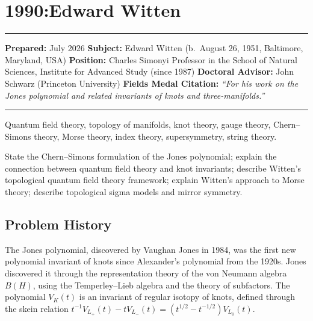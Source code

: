 \chapter{1990:Edward Witten}\label{ch1990edwardwitten:edward-witten-fields-medal-1990-a-comprehensive-report}

\begin{center}\rule{0.5\linewidth}{0.5pt}\end{center}

\textbf{Prepared:} July 2026 \textbf{Subject:} Edward Witten (b.~August 26, 1951, Baltimore, Maryland, USA) \textbf{Position:} Charles Simonyi Professor in the School of Natural Sciences, Institute for Advanced Study (since 1987) \textbf{Doctoral Advisor:} John Schwarz (Princeton University) \textbf{Fields Medal Citation:} \emph{``For his work on the Jones polynomial and related invariants of knots and three-manifolds.''}

\begin{center}\rule{0.5\linewidth}{0.5pt}\end{center}

\begin{prereqs} Quantum field theory, topology of manifolds, knot theory, gauge theory, Chern--Simons theory, Morse theory, index theory, supersymmetry, string theory. \end{prereqs}

\begin{objectives} State the Chern--Simons formulation of the Jones polynomial; explain the connection between quantum field theory and knot invariants; describe Witten's topological quantum field theory framework; explain Witten's approach to Morse theory; describe topological sigma models and mirror symmetry. \end{objectives}

\section{Problem History}

The Jones polynomial, discovered by Vaughan Jones in 1984, was the first new polynomial invariant of knots since Alexander's polynomial from the 1920s. Jones discovered it through the representation theory of the von Neumann algebra $B(H)$, using the Temperley--Lieb algebra and the theory of subfactors. The polynomial $V_K(t)$ is an invariant of regular isotopy of knots, defined through the skein relation $t^{-1}V_{L_+}(t) - tV_{L_-}(t) = (t^{1/2} - t^{-1/2})V_{L_0}(t)$.

